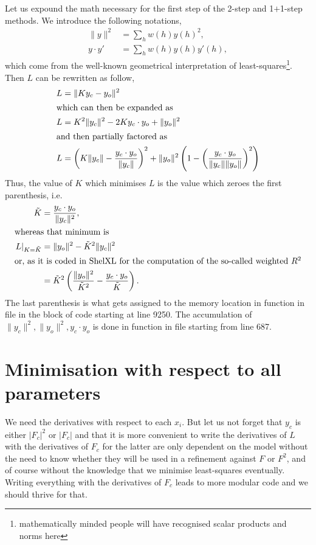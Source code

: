 \documentclass[11pt]{article}
\begin{document}
Let us expound the math necessary for the first step of the 2-step and 1$+$1-step methods. We introduce the following notations,
\begin{align}
\|y\|^2 &= \sum_h w(h)y(h)^2,\\
y \cdot y' &= \sum_h w(h) y(h) y'(h),
\end{align}
which come from the well-known geometrical interpretation of least-squares\footnote{mathematically minded people will have recognised scalar products and norms here}. Then $L$ can be rewritten as follow,
\begin{align}
L &= \| K y_c - y_o \|^2
\label{eqn:L:def:geom}\\
\intertext{which can then be expanded as}
L &= K^2 \|y_c\|^2 -2K y_c \cdot y_o + \|y_o\|^2
\label{eqn:L:def:geom:expanded}
\\
\intertext{and then partially factored as}
L &= \left(K \|y_c\| - \frac{y_c \cdot y_o}{\|y_c\|}\right)^2
+  \|y_o\|^2 \left(1 - \left(\frac{y_c \cdot y_o}{\|y_c\| \|y_o\|}\right)^2 \right) \nonumber
\end{align}
Thus, the value of $K$ which minimises $L$ is the value which zeroes the first parenthesis, i.e.
\begin{align}
\tilde{K} &= \frac{y_c \cdot y_o}{\|y_c\|^2},
\label{eqn:min:L:wrt:K}\\
\intertext{whereas that minimum is}
\left. L \right|_{K=\tilde{K}} &= \|y_o\|^2 - \tilde{K}^2 \|y_c\|^2
\label{eqn:min:L:wrt:K:val}
\\
\intertext{or, as it is coded in ShelXL for the computation of the so-called weighted $R^2$}
&= \tilde{K}^2 \left(\frac{\|y_o\|^2}{\tilde{K}^2} - \frac{y_c \cdot y_o}{\tilde{K}} \right).
\end{align}
The last parenthesis is what gets assigned to the memory location  in function  in file  in the block of code starting at line 9250. The accumulation of $\|y_c\|^2, \|y_o\|^2, y_c \cdot y_o$ is done in function  in file  starting from line 687.

\section{Minimisation with respect to all parameters}

We need the derivatives with respect to each $x_i$. But let us not forget that $y_c$ is either $|F_c|^2$ or $|F_c|$ and that it is more convenient to write the derivatives of $L$ with the derivatives of $F_c$ for the latter are only dependent on the model without the need to know whether they will be used in a refinement against $F$ or $F^2$, and of course without the knowledge that we minimise least-squares eventually. Writing everything with the derivatives of $F_c$ leads to more modular code and we should thrive for that.
\end{document}
